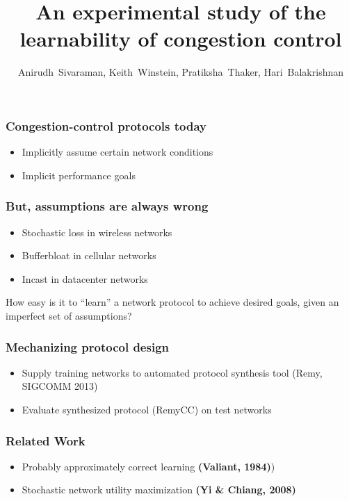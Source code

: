 \documentclass[svgnames]{beamer}
\title{An experimental study of the learnability of congestion control}
\author{Anirudh~Sivaraman, Keith~Winstein, Pratiksha~Thaker, Hari~Balakrishnan}
\institute{MIT CSAIL\vspace{\baselineskip}}
\begin{document}
\begin{frame}

\titlepage

\end{frame}

\begin{Large}
\begin{frame}
\frametitle{Congestion-control protocols today}
\begin{itemize}
\item<2-> Implicitly assume certain network conditions
\item<3-> Implicit performance goals
\end{itemize}
\end{frame}

\begin{frame}
\frametitle{But, assumptions are always wrong}
\begin{itemize}
\item<2-> Stochastic loss in wireless networks
\item<3-> Bufferbloat in cellular networks
\item<4-> Incast in datacenter networks
\end{itemize}
\end{frame}

\begin{frame}
\begin{center}
How easy is it to “learn” a network protocol to achieve desired goals, given
an imperfect set of assumptions?
\end{center}
\end{frame}

\begin{frame}
\frametitle{Mechanizing protocol design}
\begin{itemize}
\item <2->Supply training networks to automated protocol synthesis tool (Remy, SIGCOMM 2013) 
\item <3->Evaluate synthesized protocol (RemyCC) on test networks
\end{itemize}
\end{frame}







 



\begin{frame}
\frametitle{Related Work}
\begin{itemize}
\item Probably approximately correct learning \textbf{(Valiant, 1984)})
\item Stochastic network utility maximization \textbf{(Yi \& Chiang, 2008)}
\end{itemize}
\end{frame}


\end{Large}
\end{document}
